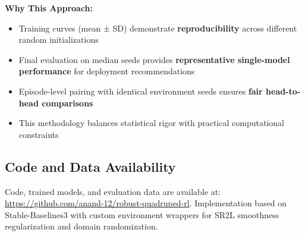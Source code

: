 \documentclass[conference]{IEEEtran}
\begin{document}
\textbf{Why This Approach:}
\begin{itemize}
    \item Training curves (mean ± SD) demonstrate \textbf{reproducibility} across different random initializations
    \item Final evaluation on median seeds provides \textbf{representative single-model performance} for deployment recommendations
    \item Episode-level pairing with identical environment seeds ensures \textbf{fair head-to-head comparisons}
    \item This methodology balances statistical rigor with practical computational constraints
\end{itemize}

\subsection{Code and Data Availability}

Code, trained models, and evaluation data are available at: \url{https://github.com/anand-12/robust-quadruped-rl}. Implementation based on Stable-Baselines3 with custom environment wrappers for SR2L smoothness regularization and domain randomization.
\end{document}
